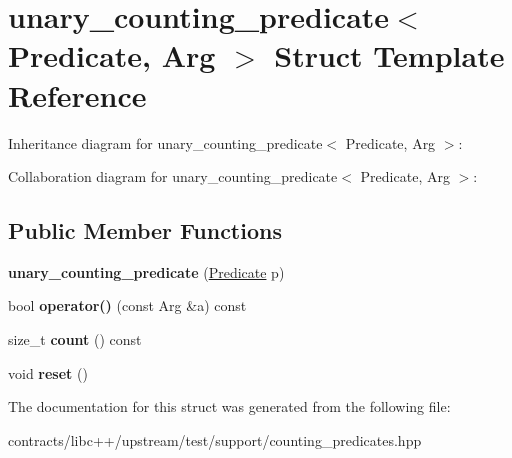 \hypertarget{structunary__counting__predicate}{}\section{unary\+\_\+counting\+\_\+predicate$<$ Predicate, Arg $>$ Struct Template Reference}
\label{structunary__counting__predicate}


Inheritance diagram for unary\+\_\+counting\+\_\+predicate$<$ Predicate, Arg $>$\+:


Collaboration diagram for unary\+\_\+counting\+\_\+predicate$<$ Predicate, Arg $>$\+:
\subsection*{Public Member Functions}
\begin{DoxyCompactItemize}
\item 
\mbox{\label{structunary__counting__predicate_a94d2662aefa9fec6fb2af8e8939104c9}} 
{\bfseries unary\+\_\+counting\+\_\+predicate} (\mbox{\hyperlink{structunary__counting__predicate}{Predicate}} p)
\item 
\mbox{\label{structunary__counting__predicate_a2f595b4f67e127c6d5ebabc02d75b247}} 
bool {\bfseries operator()} (const Arg \&a) const
\item 
\mbox{\label{structunary__counting__predicate_ae3eb4f2be102e04f8043328bfc2c22b8}} 
size\+\_\+t {\bfseries count} () const
\item 
\mbox{\label{structunary__counting__predicate_acbc4f7a3ebcedf5a6b75eac2a7e43c0e}} 
void {\bfseries reset} ()
\end{DoxyCompactItemize}


The documentation for this struct was generated from the following file\+:\begin{DoxyCompactItemize}
\item 
contracts/libc++/upstream/test/support/counting\+\_\+predicates.\+hpp\end{DoxyCompactItemize}
